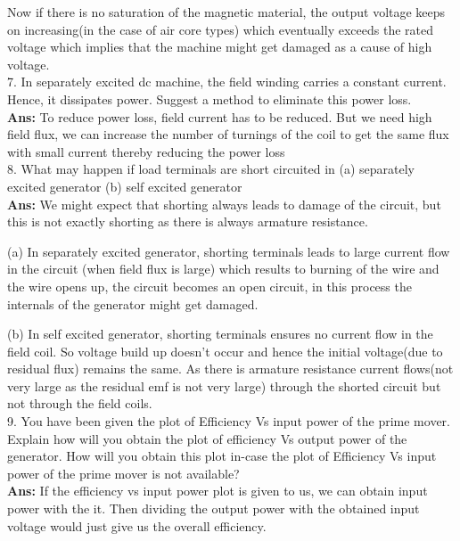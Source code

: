 \documentclass[12pt]{article}
\begin{document}
    Now if there is no saturation of the magnetic material, the output voltage keeps on increasing(in the case of air core types) which eventually exceeds the rated voltage which implies that the machine might get damaged as a cause of high voltage.
    \vspace{0.1cm}\\
    7. In separately excited dc machine, the field winding carries a constant current. Hence, it dissipates power. Suggest a method to eliminate this power loss.\vspace{0.1cm}\\
    \textbf{Ans:} To reduce power loss, field current has to be reduced. But we need high field flux, we can increase the number of turnings of the coil to get the same flux with small current thereby reducing the power loss  
    \vspace{0.1cm}\\
    8. What may happen if load terminals are short circuited in (a) separately excited generator (b) self excited generator\vspace{0.1cm}\\
    \textbf{Ans:} We might expect that shorting always leads to damage of the circuit, but this is not exactly shorting as there is always armature resistance.
    
    (a) In separately excited generator, shorting terminals leads to large current flow in the circuit (when field flux is large) which results to burning of the wire and the wire opens up, the circuit becomes an open circuit, in this process the internals of the generator might get damaged.%
    
    (b) In self excited generator, shorting terminals ensures no current flow in the field coil. So voltage build up doesn't occur and hence the initial voltage(due to residual flux) remains the same. As there is armature resistance current flows(not very large as the residual emf is not very large) through the shorted circuit but not through the field coils.
    \vspace{0.1cm}\\
    9. You have been given the plot of Efficiency Vs input power of the prime mover. Explain how will you obtain the plot of efficiency Vs output power of the generator. How will you obtain this plot in-case the plot of Efficiency Vs input power of the prime mover is not available?\vspace{0.1cm}\\
    \textbf{Ans:} If the efficiency vs input power plot is given to us, we can obtain input power with the it. Then dividing the output power with the obtained input voltage would just give us the overall efficiency.
    
\end{document}
